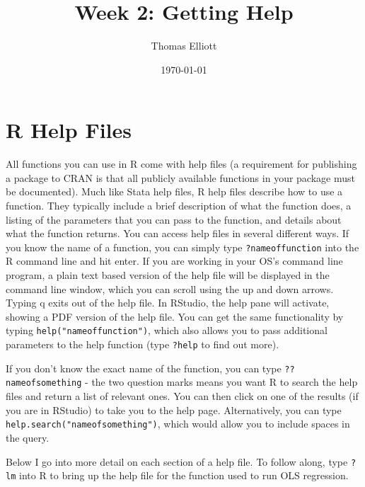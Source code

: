 \documentclass[12pt, oneside]{amsart}   	%
\title{Week 2: Getting Help}
\author{Thomas Elliott}
\date{\today}							%
\begin{document}
\maketitle
\lstset{language=R}

\section{R Help Files}

All functions you can use in R come with help files (a requirement for publishing a package to CRAN is that all publicly available functions in your package must be documented). Much like Stata help files, R help files describe how to use a function. They typically include a brief description of what the function does, a listing of the parameters that you can pass to the function, and details about what the function returns. You can access help files in several different ways. If you know the name of a function, you can simply type \texttt{?nameoffunction} into the R command line and hit enter. If you are working in your OS's command line program, a plain text based version of the help file will be displayed in the command line window, which you can scroll using the up and down arrows. Typing q exits out of the help file. In RStudio, the help pane will activate, showing a PDF version of the help file. You can get the same functionality by typing \texttt{help("nameoffunction")}, which also allows you to pass additional parameters to the help function (type \texttt{?help} to find out more). 

If you don't know the exact name of the function, you can type \texttt{??nameofsomething} - the two question marks means you want R to search the help files and return a list of relevant ones. You can then click on one of the results (if you are in RStudio) to take you to the help page. Alternatively, you can type \texttt{help.search("nameofsomething")}, which would allow you to include spaces in the query.

Below I go into more detail on each section of a help file. To follow along, type \texttt{?lm} into R to bring up the help file for the function used to run OLS regression.
\end{document}
